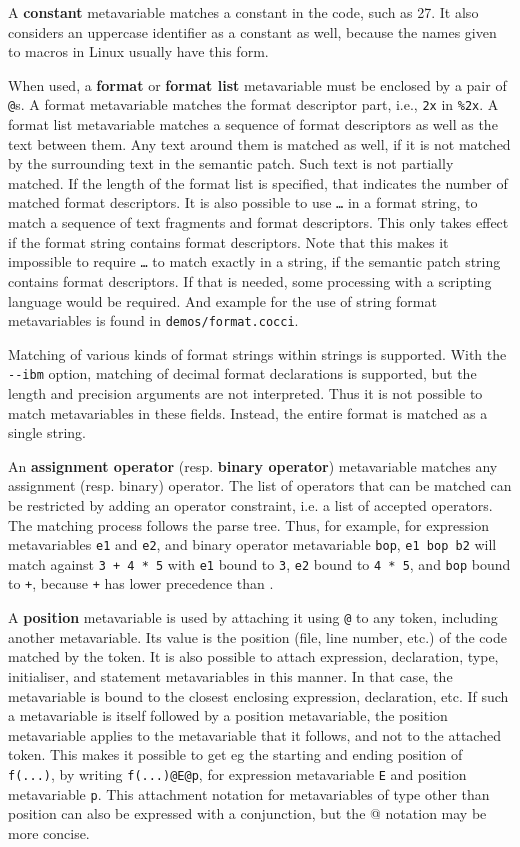 A {\bf constant} metavariable matches a constant in the code, such as 27. It also
considers an uppercase identifier as a constant as well, because the names given
to macros in Linux usually have this form.

When used, a {\bf format} or {\bf format list} metavariable must be
enclosed by a pair of \texttt{@}s.  A format metavariable matches the
format descriptor part, i.e., \texttt{2x} in \texttt{\%2x}.  A format list
metavariable matches a sequence of format descriptors as well as the text
between them.  Any text around them is matched as well, if it is not
matched by the surrounding text in the semantic patch.  Such text is not
partially matched.  If the length of the format list is specified, that
indicates the number of matched format descriptors.  It is also possible to
use \texttt{\ldots} in a format string, to match a sequence of text
fragments and format descriptors.  This only takes effect if the format
string contains format descriptors.  Note that this makes it impossible to
require \texttt{\ldots} to match exactly in a string, if the semantic patch
string contains format descriptors.  If that is needed, some processing
with a scripting language would be required.  And example for the use of
string format metavariables is found in {\tt demos/format.cocci}.

Matching of various kinds of format strings within strings is supported.
With the {\tt -{}-ibm} option, matching of decimal format declarations is
supported, but the length and precision arguments are not interpreted.
Thus it is not possible to match metavariables in these fields.  Instead,
the entire format is matched as a single string.

An {\bf assignment operator} (resp. {\bf binary operator}) metavariable matches
any assignment (resp. binary) operator. The list of operators that can be
matched can be restricted by adding an operator constraint, i.e. a list of
accepted operators.  The matching process follows the parse tree.  Thus,
for example, for expression metavariables {\tt e1} and {\tt e2}, and binary
operator metavariable {\tt bop}, {\tt e1 bop b2} will match against {\tt 3
  + 4 * 5} with {\tt e1} bound to {\tt 3}, {\tt e2} bound to {\tt 4 * 5},
and {\tt bop} bound to {\tt +}, because {\tt +} has lower precedence than
{\tt *}.

A {\bf position} metavariable is used by attaching it using \texttt{@} to
any token, including another metavariable. Its value is the position
(file, line number, etc.) of the code matched by the token. It is also
possible to attach expression, declaration, type, initialiser, and
statement metavariables in this manner. In that case, the metavariable is
bound to the closest enclosing expression, declaration, etc. If such a
metavariable is itself followed by a position metavariable, the position
metavariable applies to the metavariable that it follows, and not to the
attached token. This makes it possible to get eg the starting and ending
position of {\tt f(...)}, by writing {\tt f(...)@E@p}, for expression
metavariable {\tt E} and position metavariable {\tt p}. This attachment
notation for metavariables of type other than position can also be
expressed with a conjunction, but the @ notation may be more concise.


